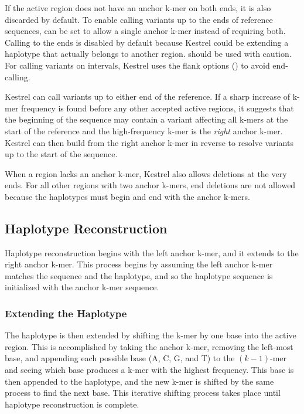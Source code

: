 If the active region does not have an anchor k-mer on both ends, it is also discarded by default. To enable calling variants up to the ends of reference sequences,  can be set to allow a single anchor k-mer instead of requiring both. Calling to the ends is disabled by default because Kestrel could be extending a haplotype that actually belongs to another region.  should be used with caution. For calling variants on intervals, Kestrel uses the flank options () to avoid end-calling.

Kestrel can call variants up to either end of the reference. If a sharp increase of k-mer frequency is found before any other accepted active regions, it suggests that the beginning of the sequence may contain a variant affecting all k-mers at the start of the reference and the high-frequency k-mer is the \textit{right} anchor k-mer. Kestrel can then build from the right anchor k-mer in reverse to resolve variants up to the start of the sequence.

When a region lacks an anchor k-mer, Kestrel also allows deletions at the very ends. For all other regions with two anchor k-mers, end deletions are not allowed because the haplotypes must begin and end with the anchor k-mers.

\subsection{Haplotype Reconstruction}
\label{sec.process.haplo}

Haplotype reconstruction begins with the left anchor k-mer, and it extends to the right anchor k-mer. This process begins by assuming the left anchor k-mer matches the sequence and the haplotype, and so the haplotype sequence is initialized with the anchor k-mer sequence.

\subsubsection{Extending the Haplotype}
\label{sec.process.haplo.extend}

The haplotype is then extended by shifting the k-mer by one base into the active region. This is accomplished by taking the anchor k-mer, removing the left-most base, and appending each possible base (A, C, G, and T) to the $(k - 1)$-mer and seeing which base produces a k-mer with the highest frequency. This base is then appended to the haplotype, and the new k-mer is shifted by the same process to find the next base. This iterative shifting process takes place until haplotype reconstruction is complete.

